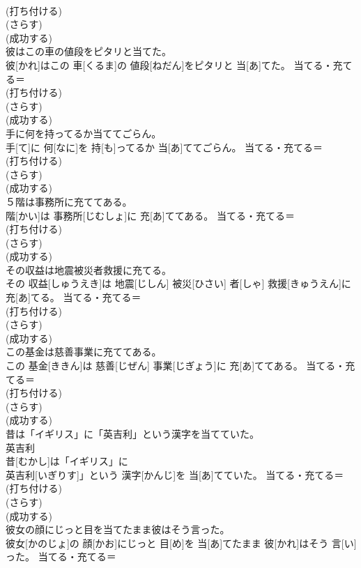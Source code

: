 \documentclass[8pt]{extreport}
\begin{document}
\begin{CJK}{UTF8}{min}
{\\	(打ち付ける) 
\\	(さらす) 
\\	(成功する) 
\\	彼はこの車の値段をピタリと当てた。	
\\	彼[かれ]はこの 車[くるま]の 値段[ねだん]をピタリと 当[あ]てた。	当てる・充てる＝ 
\\	(打ち付ける) 
\\	(さらす) 
\\	(成功する) 
\\	手に何を持ってるか当ててごらん。	
\\	手[て]に 何[なに]を 持[も]ってるか 当[あ]ててごらん。	当てる・充てる＝ 
\\	(打ち付ける) 
\\	(さらす) 
\\	(成功する) 
\\	５階は事務所に充ててある。	
\\	階[かい]は 事務所[じむしょ]に 充[あ]ててある。	当てる・充てる＝ 
\\	(打ち付ける) 
\\	(さらす) 
\\	(成功する) 
\\	その収益は地震被災者救援に充てる。	
\\	その 収益[しゅうえき]は 地震[じしん] 被災[ひさい] 者[しゃ] 救援[きゅうえん]に 充[あ]てる。	当てる・充てる＝ 
\\	(打ち付ける) 
\\	(さらす) 
\\	(成功する) 
\\	この基金は慈善事業に充ててある。	
\\	この 基金[ききん]は 慈善[じぜん] 事業[じぎょう]に 充[あ]ててある。	当てる・充てる＝ 
\\	(打ち付ける) 
\\	(さらす) 
\\	(成功する) 
\\	昔は「イギリス」に「英吉利」という漢字を当てていた。	
\\	英吉利 
\\	昔[むかし]は「イギリス」に
\\	英吉利[いぎりす]」という 漢字[かんじ]を 当[あ]てていた。	当てる・充てる＝ 
\\	(打ち付ける) 
\\	(さらす) 
\\	(成功する) 
\\	彼女の顔にじっと目を当てたまま彼はそう言った。	
\\	彼女[かのじょ]の 顔[かお]にじっと 目[め]を 当[あ]てたまま 彼[かれ]はそう 言[い]った。	当てる・充てる＝ 
}
\end{CJK}
\end{document}
